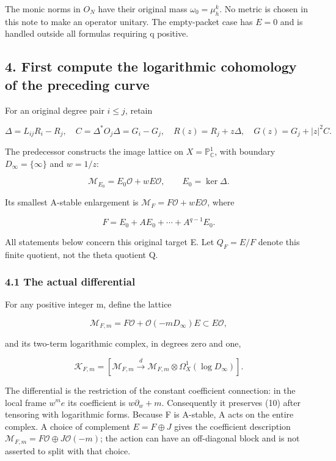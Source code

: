 \documentclass[
  11pt,
]{article}
\begin{document}
The monic norms in \(O_N\) have their original mass
\(\omega_0=\mu_h^k\). No metric is chosen in this note to make an
operator unitary. The empty-packet case has \(E=0\) and is handled
outside all formulas requiring q positive.

\subsection{4. First compute the logarithmic cohomology of the preceding
curve}\label{first-compute-the-logarithmic-cohomology-of-the-preceding-curve}

For an original degree pair \(i\le j\), retain

\[
\Delta=L_{ij}R_i-R_j,\quad C=\Delta^*O_j\Delta=G_i-G_j,
\quad R(z)=R_j+z\Delta,
\quad G(z)=G_j+|z|^2C.
\tag{7}
\]

The predecessor constructs the image lattice on
\(X=\mathbb P^1_{\mathbb C}\), with boundary \(D_\infty=\{\infty\}\) and
\(w=1/z\):

\[
\mathcal M_{E_0}=E_0\mathcal O+wE\mathcal O,\qquad E_0=\ker\Delta.
\tag{8}
\]

Its smallest A-stable enlargement is
\(\mathcal M_F=F\mathcal O+wE\mathcal O\), where

\[
F=E_0+AE_0+\cdots+A^{q-1}E_0.
\tag{9}
\]

All statements below concern this original target E. Let \(Q_F=E/F\)
denote this finite quotient, not the theta quotient Q.

\subsubsection{4.1 The actual
differential}\label{the-actual-differential}

For any positive integer m, define the lattice

\[
\mathcal M_{F,m}=F\mathcal O+\mathcal O(-mD_\infty)E
\subset E\mathcal O,
\tag{10}
\]

and its two-term logarithmic complex, in degrees zero and one,

\[
\mathcal K_{F,m}=
[\mathcal M_{F,m}\xrightarrow{d}
 \mathcal M_{F,m}\otimes\Omega_X^1(\log D_\infty)].
\tag{11}
\]

The differential is the restriction of the constant coefficient
connection: in the local frame \(w^m e\) its coefficient is
\(w\partial_w+m\). Consequently it preserves (10) after tensoring with
logarithmic forms. Because F is A-stable, A acts on the entire complex.
A choice of complement \(E=F\oplus J\) gives the coefficient description
\(\mathcal M_{F,m}=F\mathcal O\oplus J\mathcal O(-m)\); the action can
have an off-diagonal block and is not asserted to split with that
choice.
\end{document}
